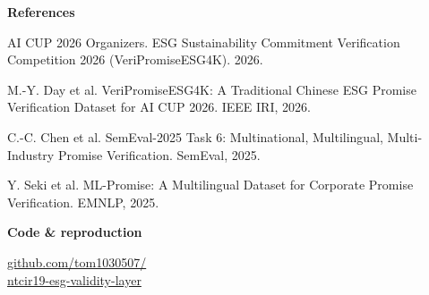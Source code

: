 \documentclass{article}
\newcommand{\notesize}{\fontsize{20}{26}\selectfont}
\begin{document}
\begin{tcolorbox}[enhanced, colback=navy, colframe=navy, arc=4mm, boxrule=0pt,
  left=12mm, right=12mm, top=7mm, bottom=7mm]
  \begin{minipage}[c]{0.66\linewidth}\notesize\color{white}\RaggedRight
    {\bfseries References}\par\vspace{2mm}
    \begin{enumerate}[label={\textcolor{numeral}{[\arabic*]}}, leftmargin=2.2em,
      itemsep=0.6mm, topsep=0pt, parsep=0pt]
      \item AI CUP 2026 Organizers. ESG Sustainability Commitment Verification
        Competition 2026 (VeriPromiseESG4K). 2026.
      \item M.-Y. Day et al. VeriPromiseESG4K: A Traditional Chinese ESG Promise
        Verification Dataset for AI CUP 2026. IEEE IRI, 2026.
      \item C.-C. Chen et al. SemEval-2025 Task 6: Multinational, Multilingual,
        Multi-Industry Promise Verification. SemEval, 2025.
      \item Y. Seki et al. ML-Promise: A Multilingual Dataset for Corporate
        Promise Verification. EMNLP, 2025.
    \end{enumerate}
  \end{minipage}\hfill
  \begin{minipage}[c]{0.20\linewidth}\RaggedLeft\color{white}
    {\bfseries\fontsize{26}{32}\selectfont Code \& reproduction\par}
    \vspace{4mm}
    {\fontsize{19}{24}\selectfont\href{https://github.com/tom1030507/ntcir19-esg-validity-layer}{github.com/tom1030507/\\ntcir19-esg-validity-layer}\par}
  \end{minipage}\hspace{8mm}
  \begin{minipage}[c]{0.11\linewidth}\centering
    \href{https://github.com/tom1030507/ntcir19-esg-validity-layer}{}
  \end{minipage}
\end{tcolorbox}
\end{document}
